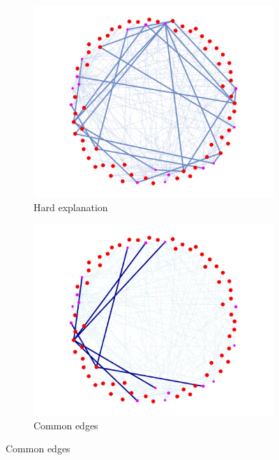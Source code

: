 \begin{figure}[h]
    \centering
    \begin{subfigure}[b]{0.3\textwidth}
        \includegraphics[width=\linewidth]{img/SAT-hard/2025-05-14 20_53_31-seed0_highestAUC_TEST.html.png}
        \caption{Hard explanation}
        \label{fig:hard_pred}
    \end{subfigure}
    \begin{subfigure}[b]{0.3\textwidth}
        \includegraphics[width=\linewidth]{img/SAT-hard/2025-05-14 20_53_47-seed0_highestAUC_commonEdges_TEST.html.png}
        \caption{Common edges}

\end{subfigure}
\end{figure}
